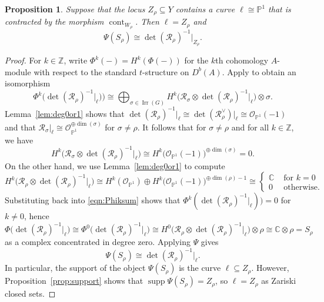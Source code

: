 \documentclass[11pt,reqno]{amsart}
\numberwithin{equation}{section}
\newtheorem{proposition}[theorem]{Proposition}
\theoremstyle{definition}
\newcommand{\CC}{\ensuremath{\mathbb{C}}}
\newcommand{\cont}{\operatorname{cont}}
\newcommand{\0}{\operatorname{0}}
\newcommand{\Irr}{\operatorname{Irr}}
\newcommand{\supp}{\operatorname{supp}}
\begin{document}
 \begin{proposition}
 \label{prop:contractP1}
 Suppose that the locus $Z_\rho\subseteq Y$ contains a curve $\ell\cong \mathbb{P}^1$ that is contracted by the morphism $\cont_{W_\rho}$. Then $\ell=Z_\rho$ and
  \[
 \Psi(S_\rho) \cong \det(\mathcal{R}_\rho)^{-1}\vert_{Z_\rho}.
 \]
 \end{proposition}
 \begin{proof}
  For $k\in \mathbb{Z}$, write $\Phi^k(-)=H^k(\Phi(-))$ for the $k$th cohomology $A$-module with respect to the standard $t$-structure on $D^b(A)$. Apply \cite[(2.2)]{CI04} to obtain an isomorphism
  \begin{equation}
  \label{eqn:Phiksum}
\Phi^k\big(\det(\mathcal{R}_\rho)^{-1}\vert_{\ell})\big) \cong 
  \bigoplus_{\sigma\in \Irr(G)} H^k\big(\mathcal{R}_\sigma\otimes \det(\mathcal{R}_\rho)^{-1}\vert_{\ell}\big)\otimes \sigma.
  \end{equation}
  Lemma~\ref{lem:deg0or1} shows that $\det(\mathcal{R}_\rho)^{-1}\vert_\ell \cong \det(\mathcal{R}_\rho^\vee)\vert_\ell \cong \mathcal{O}_{\mathbb{P}^1}(-1)$ and that $\mathcal{R}_\sigma\vert_\ell \cong \mathcal{O}_{\mathbb{P}^1}^{\oplus \dim(\sigma)}$ for $\sigma\neq \rho$. It follows that for $\sigma\neq \rho$ and for all $k\in \mathbb{Z}$, we have \[
  H^k\big(\mathcal{R}_\sigma\otimes \det(\mathcal{R}_\rho)^{-1}\vert_{\ell}\big)
   \cong 
   H^k\big(\mathcal{O}_{\mathbb{P}^1}(-1)\big)^{\oplus \dim(\sigma)}= 0.
   \]
 On the other hand, we use Lemma~\ref{lem:deg0or1} to compute
 \[
 H^k\big(\mathcal{R}_\rho\otimes \det(\mathcal{R}_\rho)^{-1}\vert_{\ell}\big)
 \cong 
 H^k(\mathcal{O}_{\mathbb{P}^1}) \oplus H^k\big(\mathcal{O}_{\mathbb{P}^1}(-1)\big)^{\oplus \dim(\rho)-1} 
 \cong 
 \left\{\begin{array}{cr} \CC & \text{ for } k=0 \\ 0 & \text{ otherwise.}
 \end{array}\right.
 \]
 Substituting back into \eqref{eqn:Phiksum} shows that $\Phi^k(\det(\mathcal{R}_\rho)^{-1}\vert_{\ell}))=0$ for $k\neq 0$, hence 
\[
\Phi\big(\det(\mathcal{R}_\rho)^{-1}\vert_{\ell}\big)\cong \Phi^0\big(\det(\mathcal{R}_\rho)^{-1}\vert_{\ell}\big)\cong H^0\big(\mathcal{R}_\rho\otimes \det(\mathcal{R}_\rho)^{-1}\vert_{\ell}\big)\otimes \rho\cong \CC\otimes \rho= S_\rho
 \]
 as a complex concentrated in degree zero. Applying $\Psi$ gives 
 \[
 \Psi(S_\rho)\cong \det(\mathcal{R}_\rho)^{-1}\vert_{\ell}.
 \]
 In particular, the support of the object $\Psi(S_\rho)$ is the curve $\ell \subseteq Z_\rho$. However, Proposition~\ref{prop:support} shows that $\supp \Psi(S_\rho)=Z_\rho$, so $\ell = Z_\rho$ as Zariski closed sets.
    \end{proof}
\end{document}
